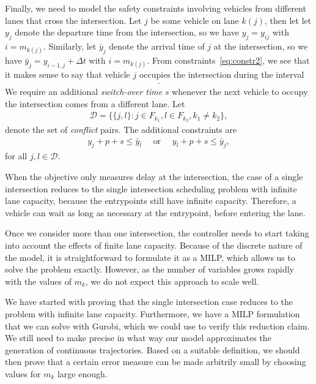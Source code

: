 \documentclass{article}
\theoremstyle{definition}
\theoremstyle{plain}
\begin{document}
Finally, we need to model the safety constraints involving vehicles from
different lanes that cross the intersection. Let $j$ be some vehicle on lane
$k(j)$, then let let $y_{j}$ denote the departure time from the intersection, so
we have $y_{j} = y_{ij}$ with $i=m_{k(j)}$. Similarly, let $\bar{y}_{j}$ denote
the arrival time of $j$ at the intersection, so we have
$\bar{y}_{j} = y_{i-1,j} + \Delta t$ with $i = m_{k(j)}$. From
constraints~\eqref{eq:constr2}, we see that it makes sense to say that vehicle
$j$ occupies the intersection during the interval
\begin{align}
  [\bar{y}_{j}, y_{j} + p] .
\end{align}
We require an additional \textit{switch-over time} $s$ whenever the next vehicle
to occupy the intersection comes from a different lane. Let
\begin{align}
  \mathcal{D} = \{ \{j, l\} : j \in F_{k_{1}}, l \in F_{k_{2}} , k_{1} \neq k_{2} \} ,
\end{align}
denote the set of \textit{conflict} pairs. The additional constraints are
\begin{align}
  \label{eq:3}
  y_{j} + p + s \leq \bar{y}_{l} \quad \text{ or } \quad y_{l} + p + s \leq \bar{y}_{j} ,
\end{align}
for all $j, l \in \mathcal{D}$.



When the objective only measures delay at the intersection, the case of a single
intersection reduces to the single intersection scheduling problem with infinite
lane capacity, because the entrypoints still have infinite capacity. Therefore,
a vehicle can wait as long as necessary at the entrypoint, before entering the
lane.


Once we consider more than one intersection, the controller needs to start
taking into account the effects of finite lane capacity. Because of the discrete
nature of the model, it is straightforward to formulate it as a MILP, which
allows us to solve the problem exactly. However, as the number of variables
grows rapidly with the values of $m_{k}$, we do not expect this approach to
scale well.


We have started with proving that the single intersection case reduces to the
problem with infinite lane capacity. Furthermore, we have a MILP formulation
that we can solve with Gurobi, which we could use to verify this
reduction claim. We still need to make precise in what way our model
approximates the generation of continuous trajectories. Based on a suitable
definition, we should then prove that a certain error measure can be made
arbitrily small by choosing values for $m_{k}$ large enough.
\end{document}
